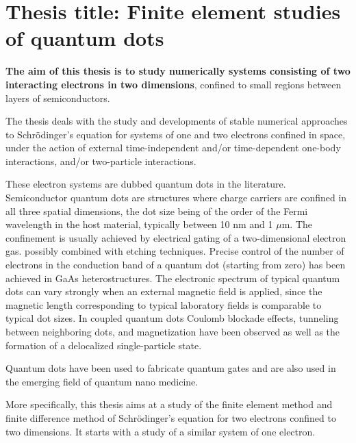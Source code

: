 \newcommand{\OP}[1]{{\bf\widehat{#1}}}

\newcommand{\be}{\begin{equation}}

\newcommand{\ee}{\end{equation}}



\pagestyle{plain}

\section*{Thesis title: Finite element  studies of quantum dots}

{\bf The aim of this thesis is to study numerically systems consisting of two
interacting electrons in two dimensions}, confined to small regions
between layers of semiconductors. 

The thesis deals with the study and developments of stable
numerical approaches to Schr\"odinger's equation for systems of one and
two electrons confined in space, under the action of external time-independent and/or time-dependent one-body interactions, and/or
two-particle interactions. 


These electron systems
are dubbed quantum dots in the literature. 
Semiconductor quantum dots are structures where
charge carriers are confined in all three spatial dimensions, 
the dot size being of the order of the Fermi wavelength 
in the host material, typically between  10 nm and  1 $\mu$m.
The confinement is usually achieved by electrical gating of a 
two-dimensional electron gas.
possibly combined with etching techniques. Precise control of the
number of electrons in the conduction band of a quantum dot 
(starting from zero) has been achieved in GaAs heterostructures. 
The electronic spectrum of typical quantum dots
can vary strongly when an external magnetic field is applied, 
since the magnetic length corresponding to typical 
laboratory fields  is comparable to typical dot sizes.
In coupled quantum dots Coulomb blockade effects, 
tunneling between neighboring dots, and magnetization 
have been observed as well as the formation of a
delocalized single-particle state. 

Quantum dots have been used to fabricate  quantum gates and are also used in the emerging field
of quantum nano medicine.  

More specifically, this thesis aims at a study of the finite element method and finite difference
method of Schr\"odinger's equation for two electrons confined to two dimensions.
It starts with a study of a similar system of one electron.

